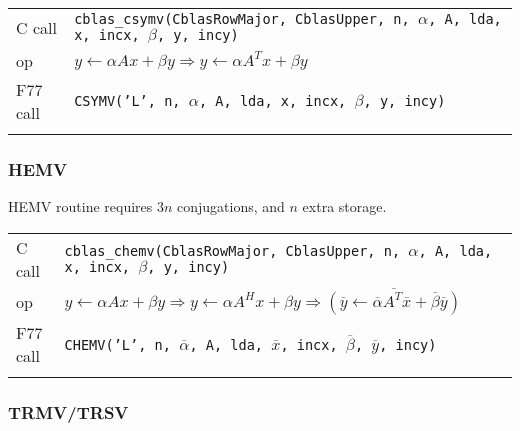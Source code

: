 \documentclass{article}
\begin{document}
{\small
\begin{tabular}{ll}
C call   & {\tt cblas\_csymv(CblasRowMajor, CblasUpper, n, $\alpha$, A, lda, x, incx, $\beta$, y, incy)}\\
op       & $y \leftarrow \alpha A x + \beta y \Rightarrow 
            y \leftarrow \alpha A^T x + \beta y$\\
F77 call & {\tt CSYMV('L', n, $\alpha$, A, lda, x, incx, $\beta$, y, incy)}\\\\
%
\end{tabular}
}

\subsubsection{HEMV}
HEMV routine requires $3n$ conjugations, and $n$ extra storage.

{\small
\begin{tabular}{ll}
C call   & {\tt cblas\_chemv(CblasRowMajor, CblasUpper, n, $\alpha$, A, lda, x, incx, $\beta$, y, incy)}\\
op       & $y \leftarrow \alpha A x + \beta y \Rightarrow 
           y \leftarrow \alpha A^H x + \beta y \Rightarrow 
           \overline{(\overline{y} \leftarrow \overline{\alpha} A^T \overline{x}
           + \overline{\beta} \overline{y})}$\\
F77 call & {\tt CHEMV('L', n, $\overline{\alpha}$, A, lda, $\overline{x}$, incx, $\overline{\beta}$, $\overline{y}$, incy)}\\\\
%
\end{tabular}
}

\subsubsection{TRMV/TRSV}
\end{document}
